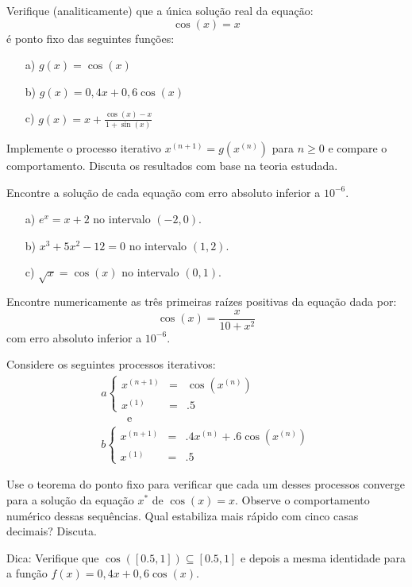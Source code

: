 \begin{exer} Verifique (analiticamente) que a única solução real da equação:
  \begin{equation*}
    \cos(x)=x  
  \end{equation*}
é ponto fixo das seguintes funções:
\begin{itemize}
\item[a)] $g(x)=\cos(x)$
\item[b)] $g(x)=0,4 x+ 0,6\cos(x)$
\item[c)] $g(x)=x+\frac{\cos(x)-x}{1+\sin(x)}$
\end{itemize}
Implemente o processo iterativo $x^{(n+1)}=g(x^{(n)})$ para $n\geq 0$ e compare o comportamento. Discuta os resultados com base na teoria estudada.
\end{exer}


\begin{exer} Encontre a solução de cada equação com erro absoluto inferior a $10^{-6}$.
  \begin{itemize}
  \item[a)] $e^x=x+2$ no intervalo $(-2,0)$.
  \item[b)] $x^3+5x^2-12=0$ no intervalo $(1,2)$.
  \item[c)] $\sqrt{x}=\cos(x)$ no intervalo $(0,1)$.
  \end{itemize}
\end{exer}

\begin{exer} Encontre numericamente as três primeiras raízes positivas da equação dada por:
  \begin{equation*}
    \cos(x)=\frac{x}{10+x^2}  
  \end{equation*}
com erro absoluto inferior a $10^{-6}$.
\end{exer}


\begin{exer} Considere os seguintes processos iterativos:
\begin{equation*}
\begin{array}{l}
a\left\{\begin{array}{rcl}
x^{(n+1)}&=&\cos(x^{(n)})\\
x^{(1)}&=&.5
\end{array}
\right. \\ \qquad \text { e }\\
b\left\{\begin{array}{rcl}
x^{(n+1)}&=&.4x^{(n)}+.6\cos(x^{(n)})\\
x^{(1)}&=&.5
\end{array}
\right.
\end{array}
\end{equation*}

Use o teorema do ponto fixo para verificar que cada um desses processos converge para a solução da equação $x^*$ de $\cos(x)=x$. Observe o comportamento numérico dessas sequências. Qual estabiliza mais rápido com cinco casas decimais? Discuta.

Dica: Verifique que $\cos([0.5,1])\subseteq [0.5,1]$ e depois a mesma identidade para a função $f(x)=0,4x+0,6\cos(x)$.
\end{exer}


